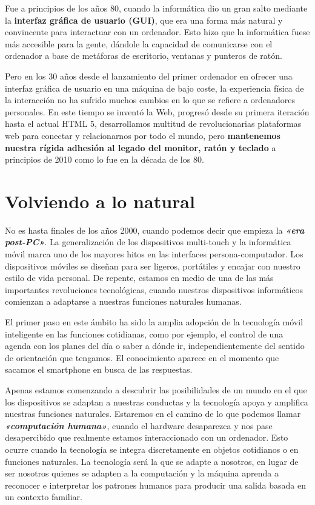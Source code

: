 Fue a principios de los años 80, cuando la informática dio un gran salto mediante la \textbf{interfaz gráfica de usuario (\acs{GUI})}, que era una forma más natural y convincente para interactuar con un ordenador. Esto hizo que la informática fuese más accesible para la gente, dándole la capacidad de comunicarse con el ordenador a base de metáforas de escritorio, ventanas y punteros de ratón.

Pero en los 30 años desde el lanzamiento del primer ordenador en ofrecer una interfaz gráfica de usuario en una máquina de bajo coste, la experiencia física de la interacción no ha sufrido muchos cambios en lo que se refiere a ordenadores personales. En este tiempo se inventó la Web, progresó desde su primera iteración hasta el actual \acs{HTML} 5, desarrollamos multitud de revolucionarias plataformas web para conectar y relacionarnos por todo el mundo, pero \textbf{mantenemos nuestra rígida adhesión al legado del monitor, ratón y teclado} a principios de 2010 como lo fue en la década de los 80. 

\section{Volviendo a lo natural}
No es hasta finales de los años 2000, cuando podemos decir que empieza la \textbf{\textit{«era post-PC»}}. La generalización de los dispositivos multi-touch y la informática móvil marca uno de los mayores hitos en las interfaces persona-computador. Los dispositivos móviles se diseñan para ser ligeros, portátiles y encajar con nuestro estilo de vida personal. De repente, estamos en medio de una de las más importantes revoluciones tecnológicas, cuando nuestros dispositivos informáticos comienzan a adaptarse a nuestras funciones naturales humanas.

El primer paso en este ámbito ha sido la amplia adopción de la tecnología móvil inteligente en las funciones cotidianas, como por ejemplo, el control de una agenda con los planes del día o saber a dónde ir, independientemente del sentido de orientación que tengamos. El conocimiento aparece en el momento que sacamos el smartphone en busca de las respuestas.

Apenas estamos comenzando a descubrir las posibilidades de un mundo en el que los dispositivos se adaptan a nuestras conductas y la tecnología apoya y amplifica nuestras funciones naturales. Estaremos en el camino de lo que podemos llamar \textbf{\textit{«computación humana»}}, cuando el hardware desaparezca y nos pase desapercibido que realmente estamos interaccionado con un ordenador. Esto ocurre cuando la tecnología se integra discretamente en objetos cotidianos o en funciones naturales. La tecnología será la que se adapte a nosotros, en lugar de ser nosotros quienes se adapten a la computación y la máquina aprenda a reconocer e interpretar los patrones humanos para producir una salida basada en un contexto familiar.

